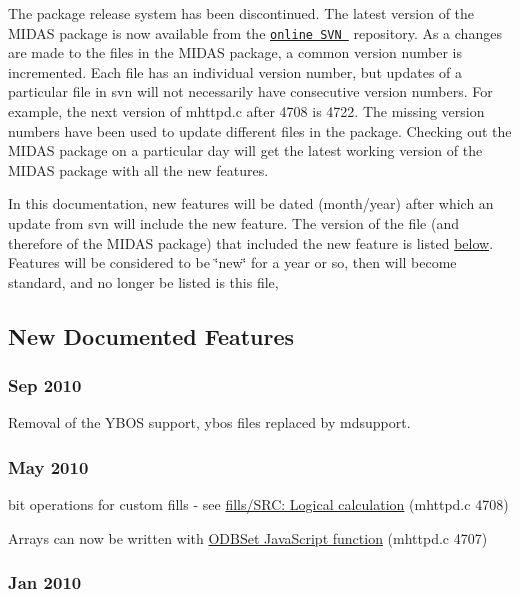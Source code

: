 \par
 The package release system has been discontinued. The latest version of the MIDAS package is now available from the \href{http://savannah.psi.ch/viewcvs/trunk/?root=midas}{\tt online SVN } repository. As a changes are made to the files in the MIDAS package, a common version number is incremented. Each file has an individual version number, but updates of a particular file in svn will not necessarily have consecutive version numbers. For example, the next version of mhttpd.c after 4708 is 4722. The missing version numbers have been used to update different files in the package. Checking out the MIDAS package on a particular day will get the latest working version of the MIDAS package with all the new features. \par
 In this documentation, new features will be dated (month/year) after which an update from svn will include the new feature. The version of the file (and therefore of the MIDAS package) that included the new feature is listed \hyperlink{NDF_ndf_New_Features}{below}. Features will be considered to be \char`\"{}new\char`\"{} for a year or so, then will become standard, and no longer be listed is this file,\hypertarget{NDF_ndf_New_Features}{}\subsection{New Documented Features}\label{NDF_ndf_New_Features}
\label{NDF_idx_YBOS}
\hypertarget{NDF_idx_YBOS}{}
 \hypertarget{NDF_ndf_sep_2010}{}\subsubsection{Sep 2010}\label{NDF_ndf_sep_2010}

\begin{DoxyItemize}
\item Removal of the YBOS support, ybos files replaced by mdsupport.
\end{DoxyItemize}\hypertarget{NDF_ndf_may_2010}{}\subsubsection{May 2010}\label{NDF_ndf_may_2010}

\begin{DoxyItemize}
\item bit operations for custom fills -\/ see \hyperlink{RC_mhttpd_Image_access_RC_mhttpd_fills_src_logical}{fills/SRC: Logical calculation} (mhttpd.c 4708)
\item Arrays can now be written with \hyperlink{RC_mhttpd_custom_ODB_access_RC_mhttpd_custom_odbset}{ODBSet JavaScript function} (mhttpd.c 4707)
\end{DoxyItemize}\hypertarget{NDF_ndf_jan_2010}{}\subsubsection{Jan 2010}\label{NDF_ndf_jan_2010}

